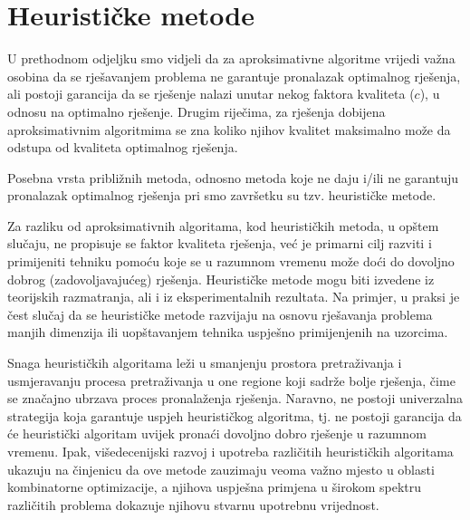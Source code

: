 \documentclass[a4paper, utf8, 11pt, colorlinks]{book}
\theoremstyle{definition}
\begin{document}

  
\section{Heurističke metode}
 U prethodnom odjeljku smo vidjeli da za aproksimativne algoritme vrijedi važna osobina da se rješavanjem problema ne garantuje pronalazak optimalnog rješenja, ali postoji garancija da se rješenje nalazi unutar nekog faktora kvaliteta ($c$), u odnosu na optimalno rješenje.  
 Drugim riječima, za rješenja dobijena aproksimativnim algoritmima se zna koliko njihov kvalitet maksimalno može da odstupa od kvaliteta optimalnog rješenja. 
 
 Posebna vrsta približnih metoda, odnosno metoda koje ne daju i/ili ne garantuju pronalazak optimalnog rješenja pri smo završetku su tzv. heurističke metode. 
 
 Za razliku od aproksimativnih algoritama, kod heurističkih metoda, u opštem slučaju, ne propisuje se faktor kvaliteta rješenja, već je primarni cilj razviti i primijeniti tehniku pomoću koje se u razumnom vremenu može doći do dovoljno dobrog (zadovoljavajućeg) rješenja. Heurističke metode mogu biti izvedene iz teorijskih razmatranja, ali i iz eksperimentalnih rezultata. Na primjer, u praksi je čest slučaj da se heurističke metode razvijaju na osnovu rješavanja problema manjih dimenzija ili uopštavanjem tehnika uspješno primijenjenih na uzorcima. 
 
 
 Snaga heurističkih algoritama leži u smanjenju prostora pretraživanja i usmjeravanju procesa pretraživanja u one regione koji sadrže bolje rješenja, čime se značajno ubrzava proces pronalaženja rješenja. Naravno, ne postoji univerzalna strategija koja garantuje uspjeh heurističkog algoritma, tj. ne postoji garancija da će heuristički algoritam uvijek pronaći dovoljno dobro rješenje u razumnom vremenu. Ipak, višedecenijski razvoj i upotreba različitih heurističkih algoritama ukazuju na činjenicu da ove metode zauzimaju veoma važno mjesto u oblasti kombinatorne optimizacije, a njihova uspješna primjena u širokom spektru različitih problema dokazuje njihovu stvarnu upotrebnu vrijednost.
 
\end{document}
